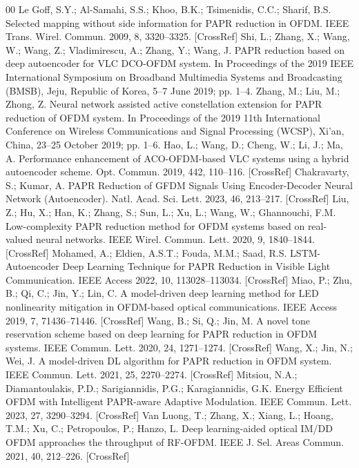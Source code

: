 \documentclass[conference]{IEEEtran}
\begin{document}
\begin{thebibliography}{00}
 Le Goff, S.Y.; Al-Samahi, S.S.; Khoo, B.K.; Tsimenidis, C.C.; Sharif, B.S. Selected mapping without side information for PAPR reduction in OFDM. IEEE Trans. Wirel. Commun. 2009, 8, 3320–3325. [CrossRef]
 Shi, L.; Zhang, X.; Wang, W.; Wang, Z.; Vladimirescu, A.; Zhang, Y.; Wang, J. PAPR reduction based on deep autoencoder for VLC DCO-OFDM system. In Proceedings of the 2019 IEEE International Symposium on Broadband Multimedia Systems and Broadcasting (BMSB), Jeju, Republic of Korea, 5–7 June 2019; pp. 1–4.
 Zhang, M.; Liu, M.; Zhong, Z. Neural network assisted active constellation extension for PAPR reduction of OFDM system. In Proceedings of the 2019 11th International Conference on Wireless Communications and Signal Processing (WCSP), Xi’an, China, 23–25 October 2019; pp. 1–6.
 Hao, L.; Wang, D.; Cheng, W.; Li, J.; Ma, A. Performance enhancement of ACO-OFDM-based VLC systems using a hybrid autoencoder scheme. Opt. Commun. 2019, 442, 110–116. [CrossRef]
 Chakravarty, S.; Kumar, A. PAPR Reduction of GFDM Signals Using Encoder-Decoder Neural Network (Autoencoder). Natl. Acad. Sci. Lett. 2023, 46, 213–217. [CrossRef]
 Liu, Z.; Hu, X.; Han, K.; Zhang, S.; Sun, L.; Xu, L.; Wang, W.; Ghannouchi, F.M. Low-complexity PAPR reduction method for OFDM systems based on real-valued neural networks. IEEE Wirel. Commun. Lett. 2020, 9, 1840–1844. [CrossRef]
 Mohamed, A.; Eldien, A.S.T.; Fouda, M.M.; Saad, R.S. LSTM-Autoencoder Deep Learning Technique for PAPR Reduction in Visible Light Communication. IEEE Access 2022, 10, 113028–113034. [CrossRef]
 Miao, P.; Zhu, B.; Qi, C.; Jin, Y.; Lin, C. A model-driven deep learning method for LED nonlinearity mitigation in OFDM-based optical communications. IEEE Access 2019, 7, 71436–71446. [CrossRef]
 Wang, B.; Si, Q.; Jin, M. A novel tone reservation scheme based on deep learning for PAPR reduction in OFDM systems. IEEE Commun. Lett. 2020, 24, 1271–1274. [CrossRef]
 Wang, X.; Jin, N.; Wei, J. A model-driven DL algorithm for PAPR reduction in OFDM system. IEEE Commun. Lett. 2021, 25, 2270–2274. [CrossRef]
 Mitsiou, N.A.; Diamantoulakis, P.D.; Sarigiannidis, P.G.; Karagiannidis, G.K. Energy Efficient OFDM with Intelligent PAPR-aware Adaptive Modulation. IEEE Commun. Lett. 2023, 27, 3290–3294. [CrossRef]
 Van Luong, T.; Zhang, X.; Xiang, L.; Hoang, T.M.; Xu, C.; Petropoulos, P.; Hanzo, L. Deep learning-aided optical IM/DD OFDM approaches the throughput of RF-OFDM. IEEE J. Sel. Areas Commun. 2021, 40, 212–226. [CrossRef]

\end{thebibliography}
\end{document}
